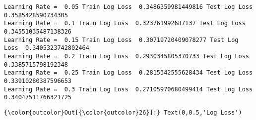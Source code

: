 \documentclass[11pt]{article}
\begin{document}
    \begin{Verbatim}[commandchars=\\\{\}]
Learning Rate =  0.05 Train Log Loss  0.3486359981449816 Test Log Loss  0.3585428590734305
Learning Rate =  0.1 Train Log Loss  0.323761992687137 Test Log Loss  0.34551035487138326
Learning Rate =  0.15 Train Log Loss  0.30719720409078277 Test Log Loss  0.3405323742802464
Learning Rate =  0.2 Train Log Loss  0.2930345805370733 Test Log Loss  0.3385715798192348
Learning Rate =  0.25 Train Log Loss  0.2815342555628434 Test Log Loss  0.33910280387596653
Learning Rate =  0.3 Train Log Loss  0.27105970680499414 Test Log Loss  0.34047511766321725

    \end{Verbatim}

\begin{Verbatim}[commandchars=\\\{\}]
{\color{outcolor}Out[{\color{outcolor}26}]:} Text(0,0.5,'Log Loss')
\end{Verbatim}
            
    \begin{center}
    \end{center}
    { \hspace*{\fill} \\}
    
\end{document}
